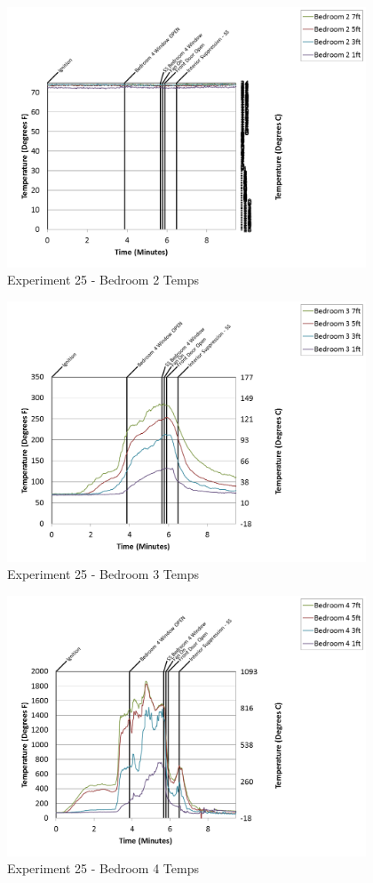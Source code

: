 \documentclass{article}
\begin{document}
\begin{appendices}
\begin{figure}[h!]
	\centering
	\includegraphics[height=3.05in]{0_Images/Results_Charts/Exp_25_Charts/Bedroom2Temps.png}
	\caption{Experiment 25 - Bedroom 2 Temps}
\end{figure}

\clearpage

\begin{figure}[h!]
	\centering
	\includegraphics[height=3.05in]{0_Images/Results_Charts/Exp_25_Charts/Bedroom3Temps.png}
	\caption{Experiment 25 - Bedroom 3 Temps}
\end{figure}


\begin{figure}[h!]
	\centering
	\includegraphics[height=3.05in]{0_Images/Results_Charts/Exp_25_Charts/Bedroom4Temps.png}
	\caption{Experiment 25 - Bedroom 4 Temps}
\end{figure}


\end{appendices}
\end{document}
